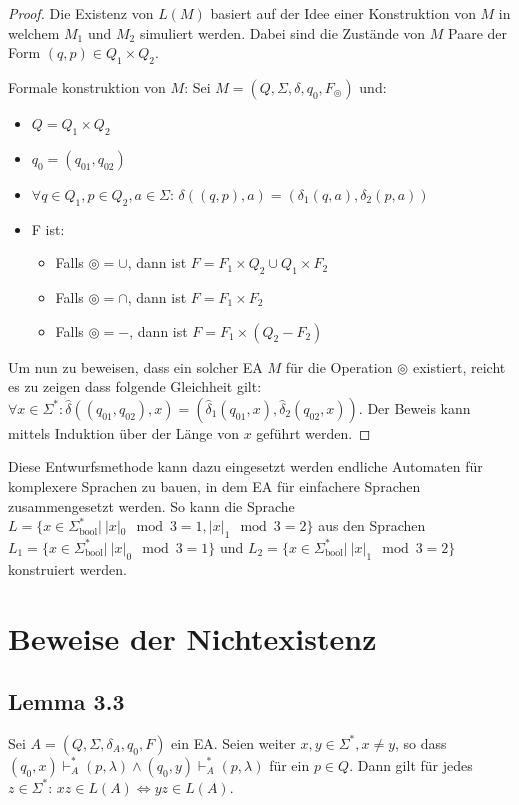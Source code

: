 \begin{proof}
Die Existenz von $L(M)$ basiert auf der Idee einer Konstruktion von $M$ in welchem $M_1$ und $M_2$ simuliert werden. Dabei sind die Zustände von $M$ Paare der Form $(q, p) \in Q_1 \times Q_2$.

Formale konstruktion von $M$: Sei $M = (Q, \Sigma, \delta, q_0, F_\circledcirc)$ und:
\begin{itemize}
  \item $Q = Q_1 \times Q_2$
  \item $q_0 = (q_{01}, q_{02})$
  \item $\forall q \in Q_1, p \in Q_2, a \in \Sigma:\, \delta((q, p), a) = (\delta_1(q, a), \delta_2(p, a))$
  \item F ist:
  \begin{itemize}
    \item Falls $\circledcirc = \cup$, dann ist $F = F_1 \times Q_2 \cup Q_1 \times F_2$
    \item Falls $\circledcirc = \cap$, dann ist $F = F_1 \times F_2$
    \item Falls $\circledcirc = -$, dann ist $F = F_1 \times (Q_2 - F_2)$
  \end{itemize}
\end{itemize}

Um nun zu beweisen, dass ein solcher EA $M$ für die Operation $\circledcirc$ existiert, reicht es zu zeigen dass folgende Gleichheit gilt: $\forall x \in \Sigma^*: \hat\delta((q_{01}, q_{02}), x) = (\hat\delta_1(q_{01}, x), \hat\delta_2(q_{02}, x))$. Der Beweis kann mittels Induktion über der Länge von $x$ geführt werden.
\end{proof}

Diese Entwurfsmethode kann dazu eingesetzt werden endliche Automaten für komplexere Sprachen zu bauen, in dem EA für einfachere Sprachen zusammengesetzt werden. So kann die Sprache $L = \{x \in \Sigma_\text{bool}^* |\ |x|_0 \mod 3 = 1, |x|_1 \mod 3 = 2\}$ aus den Sprachen $L_1 = \{x \in \Sigma_\text{bool}^* |\ |x|_0 \mod 3 = 1\}$ und $L_2 = \{x \in \Sigma_\text{bool}^* |\ |x|_1 \mod 3 = 2\}$ konstruiert werden.

\section{Beweise der Nichtexistenz}
\subsection{Lemma 3.3}
\begin{lemma}[Lemma 3.3]
Sei $A = (Q, \Sigma, \delta_A, q_0, F)$ ein EA. Seien weiter $x, y \in \Sigma^*, x \not= y$, so dass $(q_0, x) \vdash_A^* (p, \lambda) \land (q_0, y) \vdash_A^* (p, \lambda)$ für ein $p \in Q$. Dann gilt für jedes $z \in \Sigma^*:\, xz \in L(A) \Leftrightarrow yz \in L(A)$.
\end{lemma}


